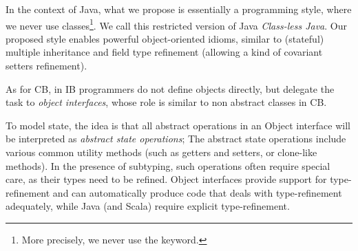 %
%
%
%



In the context of Java, what we propose is essentially a programming
style, where we never use classes\footnote{More precisely, we never
  use the \Q@class@ keyword.}.  We call this restricted version of
Java \emph{Class-less Java}.  Our proposed style enables powerful
object-oriented idioms, similar to (stateful) multiple inheritance and
field type refinement (allowing a kind of covariant setters
refinement).

As for CB, in IB programmers do not define objects directly, but
delegate the task to \emph{object interfaces}, whose role is similar
to non abstract classes in CB.

To model state, the idea is that all abstract operations in an Object
interface will be interpreted as \emph{abstract state operations}; The
abstract state operations include various common utility methods (such
as getters and setters, or clone-like methods). In the presence of
subtyping, such operations often require special care, as their types
need to be refined. Object interfaces provide support for
type-refinement and can automatically produce code that deals with
type-refinement adequately, while Java (and Scala) require explicit
type-refinement.

